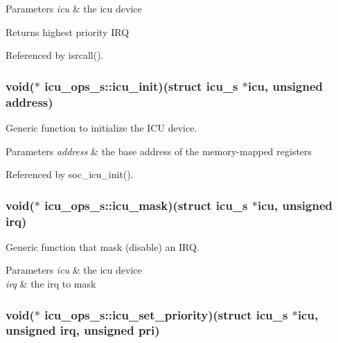 \begin{DoxyParams}{Parameters}
{\em icu} & the icu device \\
\hline
\end{DoxyParams}
\begin{DoxyReturn}{Returns}
highest priority I\-R\-Q 
\end{DoxyReturn}


Referenced by isrcall().

\hypertarget{structicu__ops__s_acfb85f348f0664db040ecc73ebbd5cc7}{
\subsubsection[{icu\-\_\-init}]{\setlength{\rightskip}{0pt plus 5cm}void($\ast$ icu\-\_\-ops\-\_\-s\-::icu\-\_\-init)(struct {\bf icu\-\_\-s} $\ast$icu, unsigned address)}}\label{structicu__ops__s_acfb85f348f0664db040ecc73ebbd5cc7}


Generic function to initialize the I\-C\-U device. 


\begin{DoxyParams}{Parameters}
{\em address} & the base address of the memory-\/mapped registers \\
\hline
\end{DoxyParams}


Referenced by soc\-\_\-icu\-\_\-init().

\hypertarget{structicu__ops__s_af63b387a2985011e4e430d568d3f0b04}{
\subsubsection[{icu\-\_\-mask}]{\setlength{\rightskip}{0pt plus 5cm}void($\ast$ icu\-\_\-ops\-\_\-s\-::icu\-\_\-mask)(struct {\bf icu\-\_\-s} $\ast$icu, unsigned irq)}}\label{structicu__ops__s_af63b387a2985011e4e430d568d3f0b04}


Generic function that mask (disable) an I\-R\-Q. 


\begin{DoxyParams}{Parameters}
{\em icu} & the icu device \\
\hline
{\em irq} & the irq to mask \\
\hline
\end{DoxyParams}
\hypertarget{structicu__ops__s_a1f08d353530f63d1877f160fd70fcdfd}{
\subsubsection[{icu\-\_\-set\-\_\-priority}]{\setlength{\rightskip}{0pt plus 5cm}void($\ast$ icu\-\_\-ops\-\_\-s\-::icu\-\_\-set\-\_\-priority)(struct {\bf icu\-\_\-s} $\ast$icu, unsigned irq, unsigned pri)}}\label{structicu__ops__s_a1f08d353530f63d1877f160fd70fcdfd}


